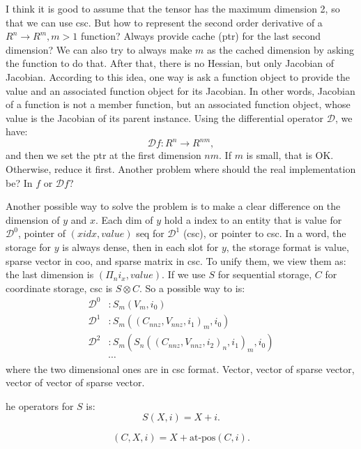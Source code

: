\documentclass[9pt,twocolumn]{extarticle}
\newcommand{\Diff}{\mathcal{D}}
\begin{document}
I think it is good to assume that the tensor has the maximum dimension
2, so that we can use csc.  But how to represent the second order
derivative of a $R^n \rightarrow R^m, m > 1$ function?  Always provide
cache (ptr) for the last second dimension?  We can also try to always
make $m$ as the cached dimension by asking the function to do that.
After that, there is no Hessian, but only Jacobian of Jacobian.
According to this idea, one way is ask a function object to provide
the value and an associated function object for its Jacobian.  In
other words, Jacobian of a function is not a member function, but an
associated function object, whose value is the Jacobian of its parent
instance.  Using the differential operator $\Diff$, we have:
\begin{equation}
  \Diff f: R^{n} \rightarrow R^{nm},
\end{equation}
and then we set the ptr at the first dimension $nm$.  If $m$ is small,
that is OK.  Otherwise, reduce it first.  Another problem where should
the real implementation be?  In $f$ or $\Diff f$?

Another possible way to solve the problem is to make a clear
difference on the dimension of $y$ and $x$.  Each dim of $y$ hold a
index to an entity that is value for $\Diff^0$, pointer of $(x idx,
value)$ seq for $\Diff^1$ (csc), or pointer to csc.  In a word, the
storage for $y$ is always dense, then in each slot for $y$, the
storage format is value, sparse vector in coo, and sparse matrix in
csc.  To unify them, we view them as: the last dimension is $(\Pi_n
i_x, value)$.  If we use $S$ for sequential storage, $C$ for
coordinate storage, csc is $S\otimes C$.  So a possible way to is:
\begin{equation}
  \begin{split}
    \Diff^0 &: S_m(V_m, i_0)\\
    \Diff^1 &: S_m((C_{nnz}, V_{nnz}, i_1)_m, i_0)\\
    \Diff^2 &: S_m(S_n((C_{nnz}, V_{nnz}, i_2)_n, i_1)_m, i_0)\\
    &\cdots
  \end{split}
\end{equation}
where the two dimensional ones are in csc format.  Vector, vector of
sparse vector, vector of vector of sparse vector.

he operators for $S$ is:
\begin{equation}
  S(X, i) = X+i.
\end{equation}

\begin{equation}
  (C, X, i) = X+\mbox{at-pos}(C, i).
\end{equation}
\end{document}
